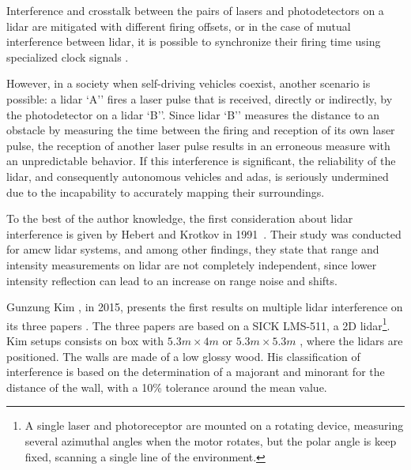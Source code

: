Interference and crosstalk between the pairs of \acp{laser} and photodetectors on a \ac{lidar} are mitigated with different firing offsets, or in the case of mutual interference between \ac{lidar}, it is possible to synchronize their firing time using specialized clock signals \cite{vlp16}.

However, in a society when self-driving vehicles coexist, another scenario is possible: a \ac{lidar} `A'' fires a \ac{laser} pulse that is received, directly or indirectly, by the photodetector on a \ac{lidar} `B''. Since \ac{lidar} `B'' measures the distance to an obstacle by measuring the time between the firing and reception of its own \ac{laser} pulse, the reception of another \ac{laser} pulse results in an erroneous measure with an unpredictable behavior. If this interference is significant, the reliability of the \ac{lidar}, and consequently autonomous vehicles and \ac{adas}, is seriously undermined due to the incapability to accurately mapping their surroundings.



To the best of the author knowledge, the first consideration about \ac{lidar} interference is given by Hebert and Krotkov in 1991~\cite{Hebert}. Their study was conducted for \ac{amcw} \ac{lidar} systems, and among other findings, they state that range and intensity measurements on \ac{lidar} are not completely independent, since lower intensity reflection can lead to an increase on range noise and shifts. 

Gunzung Kim \etal, in 2015, presents the first results on multiple \ac{lidar} interference on its three papers \cite{Kim2015a, Kim2015b, Kim2015c}. The three papers are based on a SICK LMS-511, a 2D \ac{lidar}\footnote{A single laser and photoreceptor are mounted on a rotating device, measuring several azimuthal angles when the motor rotates, but the polar angle is keep fixed, scanning a single line of the environment.}. Kim \etal setups consists on box with $5.3m \times 4m$ \cite{Kim2015a} or $5.3m \times 5.3m$ \cite{Kim2015b, Kim2015c}, where the \acp{lidar} are positioned. The walls are made of a low glossy wood. His classification of interference is based on the determination of a majorant and minorant for the distance of the wall, with a 10\% tolerance around the mean value.


